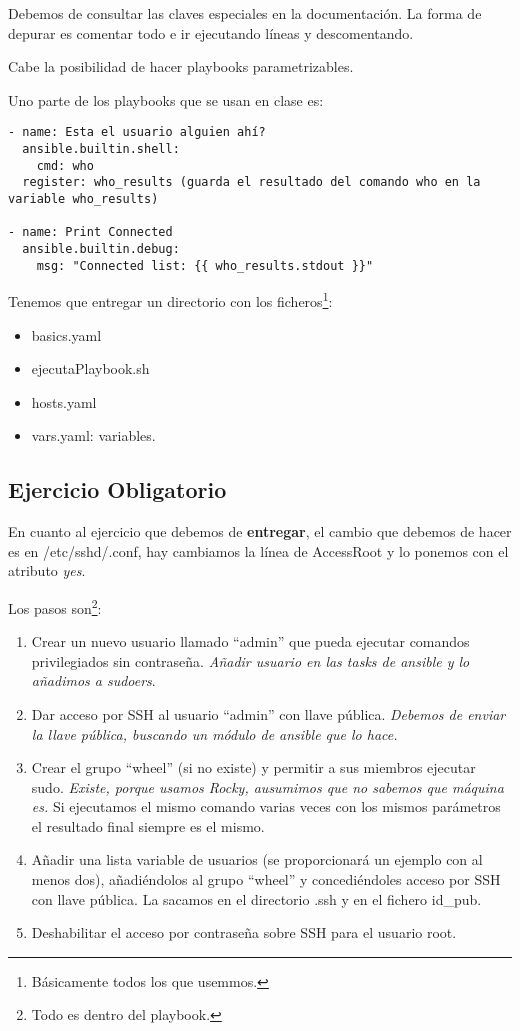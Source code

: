 Debemos de consultar las claves especiales en la documentación. La forma de depurar es comentar todo e ir ejecutando líneas y descomentando.

Cabe la posibilidad de hacer playbooks parametrizables.

Uno parte de los playbooks que se usan en clase es:

\begin{lstlisting}[style=yamlstyle]
- name: Esta el usuario alguien ahí?
  ansible.builtin.shell:
    cmd: who
  register: who_results (guarda el resultado del comando who en la variable who_results)

- name: Print Connected
  ansible.builtin.debug:
    msg: "Connected list: {{ who_results.stdout }}"
\end{lstlisting}

Tenemos que entregar un directorio con los ficheros\footnote{Básicamente todos los que usemmos.}: \begin{itemize}
    \item basics.yaml 
    \item ejecutaPlaybook.sh
    \item hosts.yaml
    \item vars.yaml: variables.
\end{itemize}


\subsection{Ejercicio Obligatorio}

En cuanto al ejercicio que debemos de \textbf{entregar}, el cambio que debemos de hacer es en /etc/sshd/.conf, hay cambiamos la línea de AccessRoot y lo ponemos con el atributo \textit{yes}.

Los pasos son\footnote{Todo es dentro del playbook.}:
\begin{enumerate}
    \item Crear un nuevo usuario llamado “admin” que pueda ejecutar comandos privilegiados sin contraseña. \textit{Añadir usuario en las tasks de ansible y lo añadimos a sudoers}.
    \item Dar acceso por SSH al usuario “admin” con llave pública. \textit{Debemos de enviar la llave pública, buscando un módulo de ansible que lo hace.}
    \item Crear el grupo “wheel” (si no existe) y permitir a sus miembros ejecutar sudo. \textit{Existe, porque usamos Rocky, ausumimos que no sabemos que máquina es.} Si ejecutamos el mismo comando varias veces con los mismos parámetros el resultado final siempre es el mismo.
    \item Añadir una lista variable de usuarios (se proporcionará un ejemplo con al menos dos), añadiéndolos al grupo “wheel” y concediéndoles acceso por SSH con llave pública. La sacamos en el directorio .ssh y en el fichero id\_pub.
    \item Deshabilitar el acceso por contraseña sobre SSH para el usuario root.
\end{enumerate}

